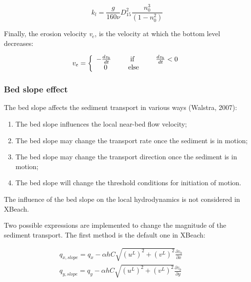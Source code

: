 \documentclass{article}
\begin{document}
\noindent 
\begin{equation} \label{2.102)} 
k_{l} =\frac{g}{160\nu } D_{15}^{2} \frac{n_{0}^{3} }{\left(1-n_{0}^{2} \right)}  
\end{equation} 


\noindent Finally, the erosion velocity \textit{v${}_{e}$}, is the velocity at which the bottom level decreases:

\noindent 
\begin{equation} \label{2.103)} 
v_{e} =\left\{\begin{array}{l} {-\frac{dz_{b} }{dt} {\rm \; \; \; \; \; \; \; \; \; \; if\; \; \; \; \; \; \; \; \; \; \; }\frac{dz_{b} }{dt} <0} \\ {{\rm \; \; \; \; }0{\rm \; \; \; \; \; \; \; \; \; \; \; else}\; \; \; \; \; \; \; \; \; \; \; } \end{array}\right.  
\end{equation} 


\subsubsection{ Bed slope effect}

\noindent The bed slope affects the sediment transport in various ways (Walstra, 2007):

\noindent 

\begin{enumerate}
\item  The bed slope influences the local near-bed flow velocity;

\item  The bed slope may change the transport rate once the sediment is in motion;

\item  The bed slope may change the transport direction once the sediment is in motion;

\item  The bed slope will change the threshold conditions for initiation of motion.
\end{enumerate}

\noindent 

\noindent The influence of the bed slope on the local hydrodynamics is not considered in XBeach.

\noindent 

\noindent Two possible expressions are implemented to change the magnitude of the sediment transport. The first method is the default one in XBeach:

\noindent 
\begin{equation} \label{2.104)} 
\begin{array}{l} {q_{x,slope} =q_{x} -\alpha hC\sqrt{\left(u^{L} \right)^{2} +\left(v^{L} \right)^{2} } \frac{\partial z_{b} }{\partial x} } \\ {q_{y,slope} =q_{y} -\alpha hC\sqrt{\left(u^{L} \right)^{2} +\left(v^{L} \right)^{2} } \frac{\partial z_{b} }{\partial y} \; \; \; \; \; \; \; } \end{array} 
\end{equation} 
\end{document}
